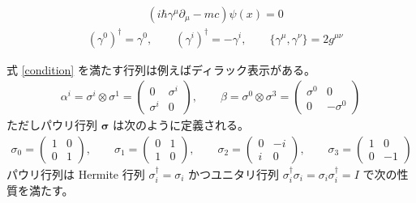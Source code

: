 \documentclass[uplatex,dvipdfmx,a4paper,11pt]{jlreq}
\theoremstyle{definition}
\numberwithin{equation}{section}
\begin{document}
\begin{definition}[ディラック方程式]
  \begin{align}
     & (i\hbar\gamma^\mu \partial_\mu - mc)\psi(x) = 0
  \end{align}
  \begin{align}
     & (\gamma^0)^\dagger = \gamma^0, \qquad (\gamma^i)^\dagger = -\gamma^i, \qquad \lbrace\gamma^\mu, \gamma^\nu\rbrace = 2g^{\mu\nu}
  \end{align}
\end{definition}
式 \eqref{condition} を満たす行列は例えばディラック表示がある。
\begin{align}
  \alpha^i = \sigma^i \otimes \sigma^1 = \begin{pmatrix}
                                           0        & \sigma^i \\
                                           \sigma^i & 0
                                         \end{pmatrix}, \qquad
  \beta = \sigma^0 \otimes \sigma^3 = \begin{pmatrix}
                                        \sigma^0 & 0         \\
                                        0        & -\sigma^0
                                      \end{pmatrix}
\end{align}
ただしパウリ行列 $\bm{\sigma}$ は次のように定義される。
\begin{align}
  \sigma_0 = \begin{pmatrix}
               1 & 0 \\
               0 & 1
             \end{pmatrix}, \qquad
  \sigma_1 = \begin{pmatrix}
               0 & 1 \\
               1 & 0
             \end{pmatrix}, \qquad
  \sigma_2 = \begin{pmatrix}
               0 & -i \\
               i & 0
             \end{pmatrix}, \qquad
  \sigma_3 = \begin{pmatrix}
               1 & 0  \\
               0 & -1
             \end{pmatrix}
\end{align}
パウリ行列は Hermite 行列 $\sigma_i^\dagger = \sigma_i$ かつユニタリ行列 $\sigma_i^\dagger\sigma_i = \sigma_i\sigma_i^\dagger = I$ で次の性質を満たす。
\end{document}

